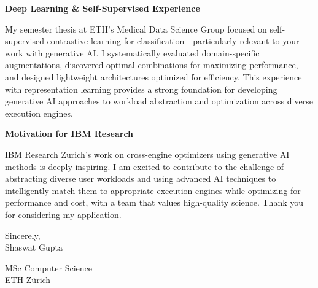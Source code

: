 \documentclass[letterpaper,10pt]{article}
\newcommand{\letterSection}[1]{%
  \begin{sectionbox}
    \color{darkroyalblue}\scshape\raggedright\large\bfseries #1
  \end{sectionbox}
}
\begin{document}
\letterSection{Deep Learning \& Self-Supervised Experience}
\begin{justify}
My semester thesis at ETH's Medical Data Science Group focused on self-supervised contrastive learning for classification—particularly relevant to your work with generative AI. I systematically evaluated domain-specific augmentations, discovered optimal combinations for maximizing performance, and designed lightweight architectures optimized for efficiency. This experience with representation learning provides a strong foundation for developing generative AI approaches to workload abstraction and optimization across diverse execution engines.
\end{justify}

\letterSection{Motivation for IBM Research}
\begin{justify}
IBM Research Zurich's work on cross-engine optimizers using generative AI methods is deeply inspiring. I am excited to contribute to the challenge of abstracting diverse user workloads and using advanced AI techniques to intelligently match them to appropriate execution engines while optimizing for performance and cost, with a team that values high-quality science. Thank you for considering my application.
\end{justify}

\vspace{2pt}

\begin{justify}
Sincerely,\\
Shaswat Gupta
\end{justify}

\begin{justify}
\vspace{4 pt}
{\color{mutedtext}
MSc Computer Science\\
ETH Zürich
}
\end{justify}
\end{document}
